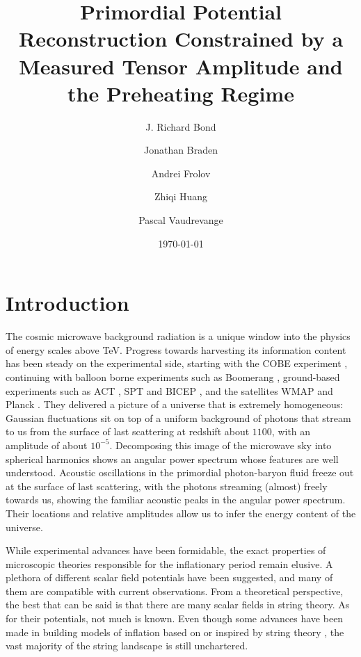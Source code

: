 \documentclass[11pt]{article}
\begin{document}
\title{Primordial Potential Reconstruction Constrained by a Measured Tensor Amplitude and the Preheating Regime}
\author[a]{J. Richard Bond}
\author[a,b]{Jonathan Braden}
\author[c]{Andrei Frolov}
\author[a]{Zhiqi Huang}
\author[d]{Pascal Vaudrevange}



\date{\today}
\maketitle

\section{Introduction}

The cosmic microwave background radiation is a unique window into the physics of energy scales above TeV. Progress towards harvesting its information content has been steady on the experimental side, starting with the COBE experiment \cite{COBE1996}, continuing with balloon borne experiments such as Boomerang \cite{Boomerang2001, Boomerang2003}, ground-based experiments such as ACT \cite{ACT2013, ACT2014}, SPT \cite{SPT2013, SPT2014} and BICEP \cite{BICEP2}, and the satellites WMAP \cite{WMAP9Maps, WMAP9Cosmology} and Planck \cite{Planck2013Overview, Planck2013PowerSpectra, Planck2013Parameters}. They delivered a picture of a universe that is extremely homogeneous: Gaussian fluctuations sit on top of a uniform background of photons that stream to us from the surface of last scattering at redshift about $1100$, with an amplitude of about $10^{-5}$. Decomposing this image of the microwave sky into spherical harmonics shows an angular power spectrum whose features are well understood. Acoustic oscillations in the primordial photon-baryon fluid freeze out at the surface of last scattering, with the photons streaming (almost) freely towards us, showing the familiar acoustic peaks in the angular power spectrum. Their locations and relative amplitudes allow us to infer the energy content of the universe.

While experimental advances have been formidable, the exact properties of microscopic theories responsible for the inflationary period remain elusive. A plethora of different scalar field potentials have been suggested, and many of them are compatible with current observations. From a theoretical perspective, the best that can be said is that there are many scalar fields in string theory. As for their potentials, not much is known. Even though some advances have been made in building models of inflation based on or inspired by string theory \cite{KKLT, Blanco-Pillado:2004ns, Blanco-Pillado:2006he, KKLMMT, CQ, GKP, Silverstein:2008sg}, the vast majority of the string landscape is still unchartered.
\end{document}
